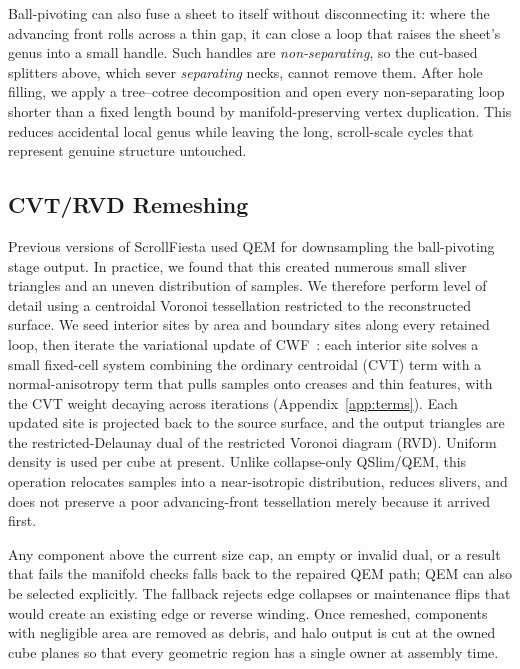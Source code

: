 Ball-pivoting can also fuse a sheet to itself without disconnecting it: where the advancing front rolls across a thin gap, it can close a loop that raises the sheet's genus into a small handle. Such handles are {\em non-separating}, so the cut-based splitters above, which sever {\em separating} necks, cannot remove them. After hole filling, we apply a tree--cotree decomposition and open every non-separating loop shorter than a fixed length bound by manifold-preserving vertex duplication. This reduces accidental local genus while leaving the long, scroll-scale cycles that represent genuine structure untouched.

\subsection{CVT/RVD Remeshing}
\label{sec:cvt}

Previous versions of ScrollFiesta used QEM for downsampling the ball-pivoting stage output. In practice, we found that this created numerous small sliver triangles and an uneven distribution of samples. We therefore perform level of detail using a centroidal Voronoi tessellation restricted to the reconstructed surface. We seed interior sites by area and boundary sites along every retained loop, then iterate the variational update of CWF~\cite{xu2024cwf}: each interior site solves a small fixed-cell system combining the ordinary centroidal (CVT) term with a normal-anisotropy term that pulls samples onto creases and thin features, with the CVT weight decaying across iterations (Appendix~\ref{app:terms}). Each updated site is projected back to the source surface, and the output triangles are the restricted-Delaunay dual of the restricted Voronoi diagram (RVD). Uniform density is used per cube at present. Unlike collapse-only QSlim/QEM, this operation relocates samples into a near-isotropic distribution, reduces slivers, and does not preserve a poor advancing-front tessellation merely because it arrived first.

Any component above the current size cap, an empty or invalid dual, or a result that fails the manifold checks falls back to the repaired QEM path; QEM can also be selected explicitly. The fallback rejects edge collapses or maintenance flips that would create an existing edge or reverse winding. Once remeshed, components with negligible area are removed as debris, and halo output is cut at the owned cube planes so that every geometric region has a single owner at assembly time.